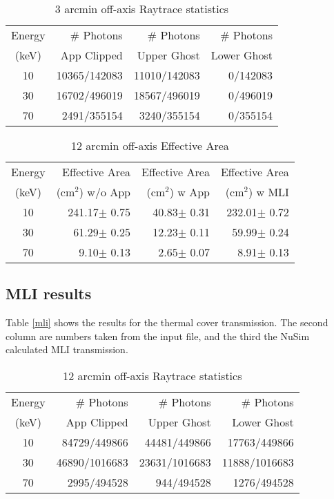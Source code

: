 \begin{table}[h]
\caption{3 arcmin off-axis Raytrace statistics}
\begin{center}
\begin{tabular}{|c|r|r|r|}
\hline
Energy & \# Photons & \# Photons &  \# Photons  \\
(keV) &  App Clipped & Upper Ghost & Lower Ghost  \\
\hline
\hline
10 & 10365/142083 & 11010/142083 & 0/142083\\
30 & 16702/496019 & 18567/496019 & 0/496019\\
70 &  2491/355154 & 3240/355154 & 0/355154 \\
\hline
\end{tabular}
\end{center}
\label{statistic2}
\end{table}

\begin{table}[h]
\caption{12 arcmin off-axis Effective Area}
\begin{center}
\begin{tabular}{|c|r|r|r|}
\hline
Energy & Effective Area & Effective Area & Effective Area \\
(keV) & (cm$^2$) w/o App & (cm$^2$) w App &(cm$^2$) w MLI \\
\hline
\hline
10 &  241.17$\pm$ 0.75 & 40.83$\pm$ 0.31 & 232.01$\pm$ 0.72\\
30 & 61.29$\pm$ 0.25 & 12.23$\pm$ 0.11 & 59.99$\pm$ 0.24 \\
70 &  9.10$\pm$ 0.13 & 2.65$\pm$ 0.07 & 8.91$\pm$ 0.13\\
\hline
\end{tabular}
\end{center}
\label{ea3}
\end{table}

\subsection{MLI results}
Table \ref{mli} shows the results for the thermal cover transmission. The second column are numbers taken from the input file, and the third the NuSim calculated MLI transmission.

\begin{table}[h]
\caption{12 arcmin off-axis Raytrace statistics}
\begin{center}
\begin{tabular}{|c|r|r|r|}
\hline
Energy & \# Photons & \# Photons &  \# Photons  \\
(keV) &  App Clipped & Upper Ghost & Lower Ghost  \\
\hline
\hline
10 & 84729/449866 & 44481/449866 & 17763/449866\\
30 & 46890/1016683 & 23631/1016683 & 11888/1016683\\
70 & 2995/494528 & 944/494528 & 1276/494528\\
\hline
\end{tabular}
\end{center}
\label{statistic3}
\end{table}

